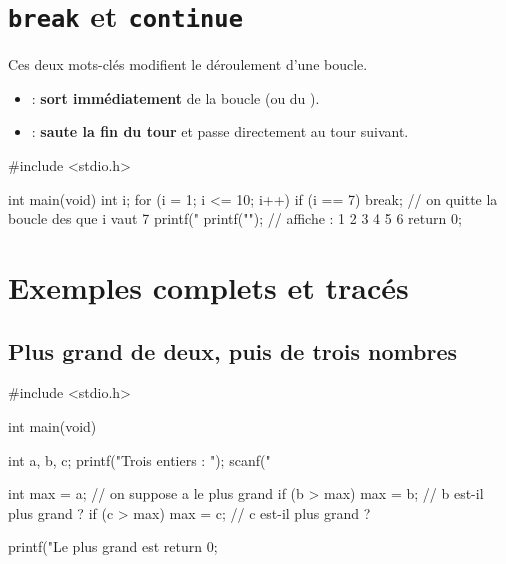 \section{\texttt{break} et \texttt{continue}}

Ces deux mots-clés modifient le déroulement d'une boucle.

\begin{itemize}
  \item {} : \textbf{sort immédiatement} de la boucle (ou du ).
  \item {} : \textbf{saute la fin du tour} et passe directement au tour
    suivant.
\end{itemize}

\begin{codec}
#include <stdio.h>

int main(void) {
    int i;
    for (i = 1; i <= 10; i++) {
        if (i == 7) {
            break;        // on quitte la boucle des que i vaut 7
        }
        printf("%
    }
    printf("\n");         // affiche : 1 2 3 4 5 6
    return 0;
}
\end{codec}


\section{Exemples complets et tracés}

\subsection{Plus grand de deux, puis de trois nombres}

\begin{codec}
#include <stdio.h>

int main(void) {
    int a, b, c;
    printf("Trois entiers : ");
    scanf("%

    int max = a;             // on suppose a le plus grand
    if (b > max) max = b;    // b est-il plus grand ?
    if (c > max) max = c;    // c est-il plus grand ?

    printf("Le plus grand est %
    return 0;
}
\end{codec}


